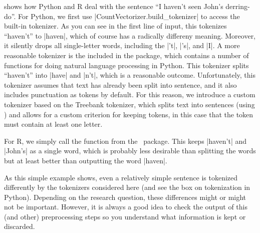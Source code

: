  shows how Python and R deal with the sentence ``I haven't seen John's derring-do''.
For Python, we first use |CountVectorizer.build_tokenizer| to access the built-in tokenizer.
As you can see in the first line of input, this tokenizes ``haven't'' to |haven|,
which of course has a radically differeny meaning. Moreover, it silently drops all single-letter words,
including the |'t|, |'s|, and |I|.
A more reasonable tokenizer is the  included in the  package, which contains a number of functions for doing natural language processing in Python.
This tokenizer splits ``haven't'' into |have| and |n't|, which is a reasonable outcome.
Unfortunately, this tokenizer assumes that text has already been split into sentence,
and it also includes punctuation as tokens by default.
For this reason, we introduce a custom tokenizer based on the Treebank tokenizer,
which splits text into sentences (using ) and allows for a custom criterion for keeping tokens,
in this case that the token must contain at least one letter. 

For R, we simply call the  function from the \quanteda\ package.
This keeps |haven't| and |John's| as a single word, which is probably less desirable than splitting the words
but at least better than outputting the word |haven|.

As this simple example shows, even a relatively simple sentence is tokenized differently by the tokenizers considered here (and see the box on tokenization in Python).
Depending on the research question, these differences might or might not be important.
However, it is always a good idea to check the output of this (and other) preprocessing steps so you understand
what information is kept or discarded.

